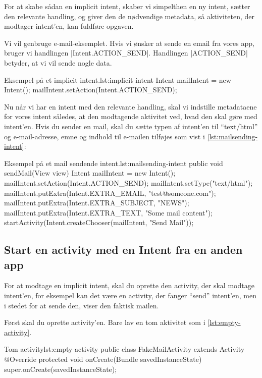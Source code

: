 For at skabe sådan en implicit intent, skaber vi simpelthen en ny intent, sætter den relevante handling, og giver den de nødvendige metadata, så aktiviteten, der modtager intent'en, kan fuldføre opgaven.

Vi vil genbruge e-mail-eksemplet. Hvis vi ønsker at sende en email fra vores app, bruger vi handlingen \JavaInline|Intent.ACTION_SEND|. Handlingen \JavaInline|ACTION_SEND| betyder, at vi vil sende nogle data.

\begin{JavaCode}{Eksempel på et implicit intent.}{lst:implicit-intent}
	Intent mailIntent = new Intent();
	mailIntent.setAction(Intent.ACTION_SEND);
\end{JavaCode}

Nu når vi har en intent med den relevante handling, skal vi indstille metadataene for vores intent således, at den modtagende aktivitet ved, hvad den skal gøre med intent'en. Hvis du sender en mail, skal du sætte typen af intent'en til ``text/html'' og e-mail-adresse, emne og indhold til e-mailen tilføjes som vist i \autoref{lst:mailsending-intent}:

\begin{JavaCode}{Eksempel på et mail sendende intent.}{lst:mailsending-intent}
	public void sendMail(View view) {
		Intent mailIntent = new Intent();
		mailIntent.setAction(Intent.ACTION_SEND);
		mailIntent.setType("text/html");
		mailIntent.putExtra(Intent.EXTRA_EMAIL, 
								  "test@someone.com");
		mailIntent.putExtra(Intent.EXTRA_SUBJECT, 
								  "NEWS");
		mailIntent.putExtra(Intent.EXTRA_TEXT, 
								  "Some mail content");
		startActivity(Intent.createChooser(mailIntent, 
										   		  "Send Mail"));
	}
\end{JavaCode}

\subsection{Start en activity med en Intent fra en anden app}

For at modtage en implicit intent, skal du oprette den activity, der skal modtage intent'en, for eksempel kan det være en activity, der fanger ``send'' intent'en, men i stedet for at sende den, viser den faktisk mailen.

Først skal du oprette activity'en. Bare lav en tom aktivitet som i \autoref{lst:empty-activity}.

\begin{JavaCode}{Tom activity}{lst:empty-activity}
	public class FakeMailActivity extends Activity {
		@Override
		protected void onCreate(Bundle savedInstanceState) {
			super.onCreate(savedInstanceState);
		}
	}
\end{JavaCode}

